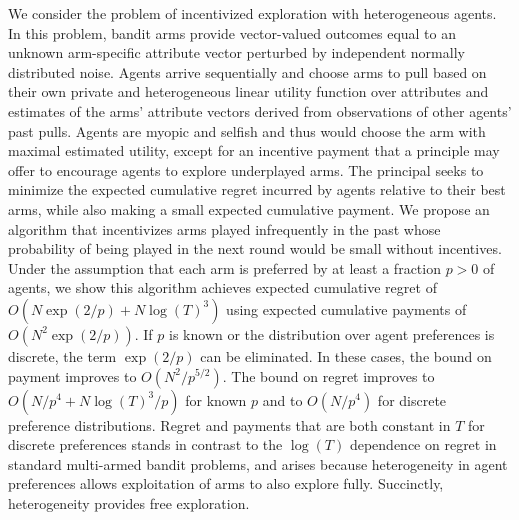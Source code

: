We consider the problem of incentivized exploration with heterogeneous agents.
In this problem, bandit arms provide vector-valued outcomes equal to an unknown
arm-specific attribute vector perturbed by independent normally distributed
noise.  Agents arrive sequentially and choose arms to pull based on their own
private and heterogeneous linear utility function over attributes and estimates
of the arms' attribute vectors derived from observations of other agents' past
pulls.  Agents are myopic and selfish and thus would choose the arm with
maximal estimated utility, except for an incentive payment that a principle may
offer to encourage agents to explore underplayed arms.  The principal seeks to
minimize the expected cumulative regret incurred by agents relative to their
best arms, while also making a small expected cumulative payment.  We propose
an algorithm that incentivizes arms played infrequently in the
past whose probability of being played in the next round would be small
without incentives.  Under the assumption that each arm is preferred by at
least a fraction $p>0$ of agents, we show this algorithm achieves expected
cumulative regret of $O(N\exp(2/p) + N \log(T)^3)$ using expected cumulative
payments of $O(N^2 \exp(2/p))$.  If $p$ is known or the distribution over agent
preferences is discrete, the term $\exp(2/p)$ can be eliminated.  In these
cases, the bound on payment improves to $O(N^2 / p^{5/2})$.  The bound on
regret improves to $O(N/p^4 + N \log(T)^3 / p)$ for known $p$ and to
$O(N/p^4)$ for discrete preference distributions.  Regret and
payments that are both constant in $T$ for discrete preferences stands
in contrast to the $\log(T)$ dependence on regret in standard multi-armed bandit
problems, and arises because heterogeneity in agent preferences allows
exploitation of arms to also explore fully.
Succinctly, heterogeneity provides free exploration.
